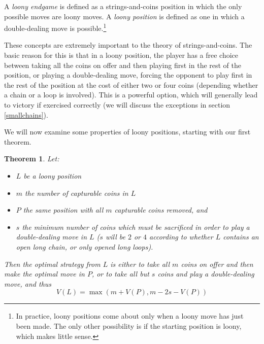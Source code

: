 \documentclass[a4paper,twocolumn]{article}
\newtheorem{loonyoptions}[thm]{Theorem}
\begin{document}
A \emph{loony endgame} is defined as a strings-and-coins position in
which the only possible moves are loony moves. A \emph{loony position}
is defined as one in which a double-dealing move is
possible.\footnote{In practice, loony positions come about only when a
  loony move has just been made. The only other possibility is if the
  starting position is loony, which makes little sense.}

These concepts are extremely important to the theory of
strings-and-coins. The basic reason for this is that in a loony
position, the player has a free choice between taking all the coins on
offer and then playing first in the rest of the position, or playing a
double-dealing move, forcing the opponent to play first in the rest of
the position at the cost of either two or four coins (depending
whether a chain or a loop is involved). This is a powerful option,
which will generally lead to victory if exercised correctly (we will
discuss the exceptions in section \ref{smallchains}).

We will now examine some properties of loony positions, starting with
our first theorem.

\begin{loonyoptions}\label{loonyoptions}
  Let:
  \begin{itemize}
    \item $L$ be a loony position
    \item $m$ the number of capturable coins in $L$
    \item $P$ the same position with all $m$ capturable coins removed,
      and
    \item $s$ the minimum number of coins which must be sacrificed in
      order to play a double-dealing move in $L$ ($s$ will be $2$ or
      $4$ according to whether $L$ contains an open long chain, or
      only opened long loops).
  \end{itemize}

  Then the optimal strategy from $L$ is either to take all $m$ coins
  on offer and then make the optimal move in $P$, or to take all but
  $s$ coins and play a double-dealing move, and thus
  $$V(L) = \max(m+V(P), m-2s-V(P))$$
\end{loonyoptions}
\end{document}

